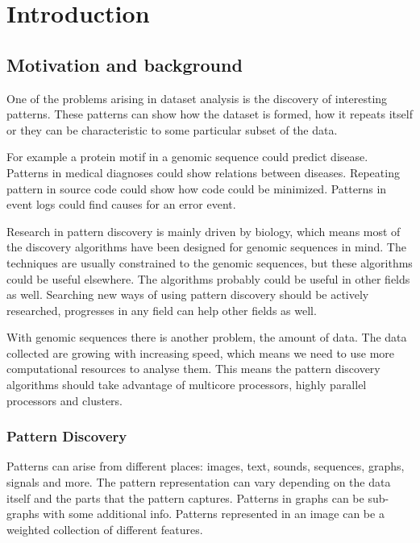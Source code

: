 \chapter{Introduction}
\label{c:introduction}

\section{Motivation and background}

One of the problems arising in dataset analysis is the discovery of interesting patterns. These patterns can show how the dataset is formed, how it repeats itself or they can be characteristic to some particular subset of the data.

For example a protein motif in a genomic sequence could predict disease. Patterns in medical diagnoses could show relations between diseases. Repeating pattern in source code could show how code could be minimized. Patterns in event logs could find causes for an error event.

Research in pattern discovery is mainly driven by biology, which means most of the discovery algorithms have been designed for genomic sequences in mind. The techniques are usually constrained to the genomic sequences, but these algorithms could be useful elsewhere. The algorithms probably could be useful in other fields as well. Searching new ways of using pattern discovery should be actively researched, progresses in any field can help other fields as well.

With genomic sequences there is another problem, the amount of data\cite{HowIsGenomeDoing}. The data collected are growing with increasing speed, which means we need to use more computational resources to analyse them. This means the pattern discovery algorithms should take advantage of multicore processors, highly parallel processors and clusters.

\subsection{Pattern Discovery}

Patterns can arise from different places: images, text, sounds, sequences, graphs, signals and more. The pattern representation can vary depending on the data itself and the parts that the pattern captures. Patterns in graphs can be sub-graphs with some additional info. Patterns represented in an image can be a weighted collection of different features.

